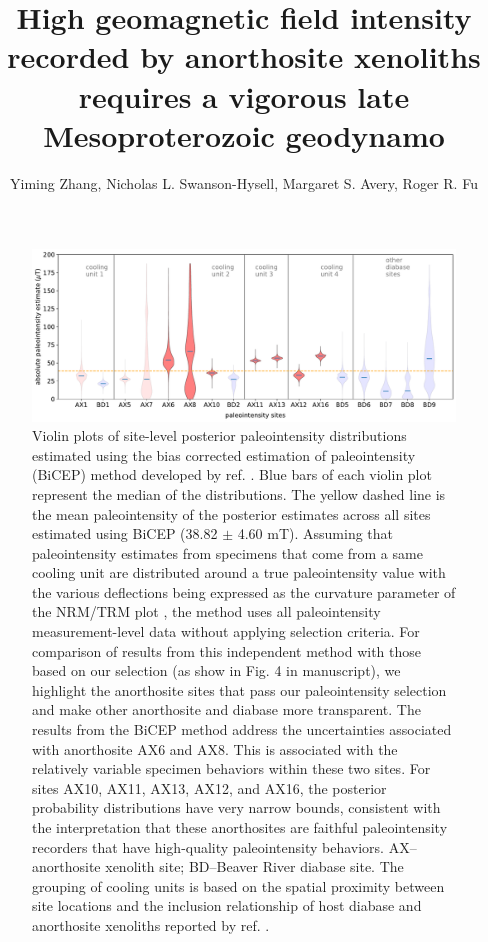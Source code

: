 \documentclass[9pt,twoside,lineno]{pnas-new}
\title{High geomagnetic field intensity recorded by anorthosite xenoliths requires a vigorous late Mesoproterozoic geodynamo}
\author{Yiming Zhang, Nicholas L. Swanson-Hysell, Margaret S. Avery, Roger R. Fu}
\begin{document}
\maketitle



\begin{figure}[h!]
\noindent\includegraphics[width=17.8 cm]{PINT_BiCEP.pdf}
\centering
\caption{{Violin plots of site-level posterior paleointensity distributions estimated using the bias corrected estimation of paleointensity (BiCEP) method developed by ref. \citealp{Cych2021a}. Blue bars of each violin plot represent the median of the distributions. The yellow dashed line is the mean paleointensity of the posterior estimates across all sites estimated using BiCEP (38.82 $\pm$ 4.60 mT). Assuming that paleointensity estimates from specimens that come from a same cooling unit are distributed around a true paleointensity value with the various deflections being expressed as the curvature parameter of the NRM/TRM plot \cite{Arai1963a, Paterson2011a}, the method uses all paleointensity measurement-level data without applying selection criteria. For comparison of results from this independent method with those based on our selection (as show in Fig. 4 in manuscript), we highlight the anorthosite sites that pass our paleointensity selection and make other anorthosite and diabase more transparent. The results from the BiCEP method address the uncertainties associated with anorthosite AX6 and AX8. This is associated with the relatively variable specimen behaviors within these two sites. For sites AX10, AX11, AX13, AX12, and AX16, the posterior probability distributions have very narrow bounds, consistent with the interpretation that these anorthosites are faithful paleointensity recorders that have high-quality paleointensity behaviors. AX--anorthosite xenolith site; BD--Beaver River diabase site. The grouping of cooling units is based on the spatial proximity between site locations and the inclusion relationship of host diabase and anorthosite xenoliths reported by ref. \citealp{Zhang2021b}.}}
\label{fig:PINT_BiCEP}
\end{figure}
\end{document}
